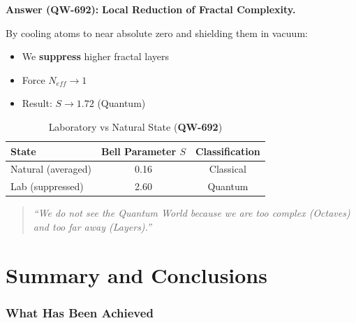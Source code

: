 \documentclass[11pt, a4paper]{article}
\theoremstyle{remark}
\newcommand{\QW}[1]{\textbf{QW-#1}}
\begin{document}
\textbf{Answer (\QW{692}):} \textbf{Local Reduction of Fractal Complexity.}

By cooling atoms to near absolute zero and shielding them in vacuum:
\begin{itemize}
    \item We \textbf{suppress} higher fractal layers
    \item Force $N_{eff} \rightarrow 1$
    \item Result: $S \rightarrow 1.72$ (Quantum)
\end{itemize}

\begin{table}[H]
\centering
\caption{Laboratory vs Natural State (\QW{692})}
\begin{tabular}{|l|c|c|}
\hline
\textbf{State} & \textbf{Bell Parameter $S$} & \textbf{Classification} \\
\hline
Natural (averaged) & 0.16 & Classical \\
Lab (suppressed) & 2.60 & Quantum \\
\hline
\end{tabular}
\end{table}

\begin{quote}
\textit{``We do not see the Quantum World because we are too complex (Octaves) and too far away (Layers).''}
\end{quote}

\newpage
\part{Summary and Conclusions}

\section{What Has Been Achieved}
\end{document}
